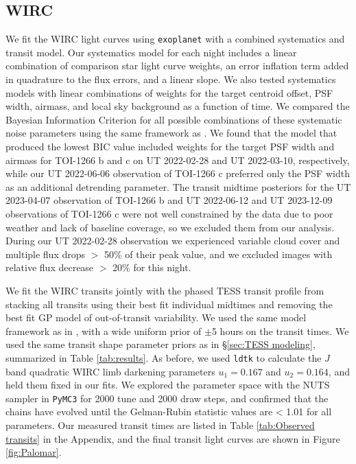 \documentclass[twocolumn]{aastex631}
\begin{document}
\subsection{WIRC} \label{sec:Palomar modeling}

We fit the WIRC light curves using \texttt{exoplanet} with a combined systematics and transit model. Our systematics model for each night includes a linear combination of comparison star light curve weights, an error inflation term added in quadrature to the flux errors, and a linear slope. We also tested systematics models with linear combinations of weights for the target centroid offset, PSF width, airmass, and local sky background as a function of time. We compared the Bayesian Information Criterion \citep[BIC,][]{Schwarz1978} for all possible combinations of these systematic noise parameters using the same framework as \cite{Jorge2024}. We found that the model that produced the lowest BIC value included weights for the target PSF width and airmass for TOI-1266 b and c on UT 2022-02-28 and UT 2022-03-10, respectively, while our UT 2022-06-06 observation of TOI-1266 c preferred only the PSF width as an additional detrending parameter. The transit midtime posteriors for the UT 2023-04-07 observation of TOI-1266 b and UT 2022-06-12 and UT 2023-12-09 observations of TOI-1266 c were not well constrained by the data due to poor weather and lack of baseline coverage, so we excluded them from our analysis. During our UT 2022-02-28 observation we experienced variable cloud cover and multiple flux drops $>$ 50\% of their peak value, and we excluded images with relative flux decrease $>$ 20\% for this night.

We fit the WIRC transits jointly with the phased TESS transit profile from stacking all transits using their best fit individual midtimes and removing the best fit GP model of out-of-transit variability. We used the same model framework as in \cite{GreklekMcKeon2023}, with a wide uniform prior of $\pm$5 hours on the transit times. We used the same transit shape parameter priors as in \S\ref{sec:TESS modeling}, summarized in Table \ref{tab:results}. As before, we used \texttt{ldtk} to calculate the $J$ band quadratic WIRC limb darkening parameters $u_1=0.167$ and $u_2=0.164$, and held them fixed in our fits. We explored the parameter space with the NUTS sampler in \texttt{PyMC3} for 2000 tune and 2000 draw steps, and confirmed that the chains have evolved until the Gelman-Rubin statistic values are < 1.01 for all parameters. Our measured transit times are listed in Table \ref{tab:Observed transits} in the Appendix, and the final transit light curves are shown in Figure \ref{fig:Palomar}.
\end{document}
